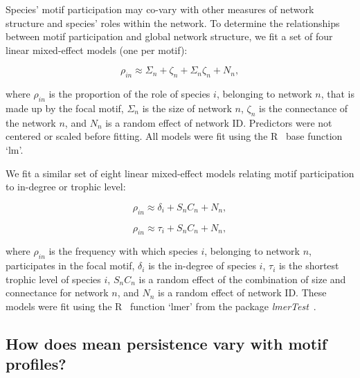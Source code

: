 \documentclass[12pt]{article}
\begin{document}
\begin{spacing}{2.0}
        Species' motif participation may co-vary with other measures of network structure and species' roles within the network.
        To determine the relationships between motif participation and global network structure, we fit a set of four linear mixed-effect models (one per motif):

        \begin{equation}
            \rho_{in} \approx \Sigma_{n} + \zeta_{n} + \Sigma_{n}\zeta_{n} + N_n ,
            \label{partic_SC}
        \end{equation}
        
        \noindent where $\rho_{in}$ is the proportion of the role of species $i$, belonging to network $n$, that is made up by the focal motif,
        $\Sigma_{n}$ is the size of network $n$, $\zeta_{n}$ is the connectance of the network $n$, and $N_n$ is a random effect of network ID.
        Predictors were not centered or scaled before fitting.
        All models were fit using the R~\citep{R} base function `lm'.

       
        We fit a similar set of eight linear mixed-effect models relating motif participation to in-degree or trophic level:
        
        \begin{equation}
            \rho_{in} \approx \delta_{i} + S_{n}C_{n} + N_n,
            \label{partic_deg}
        \end{equation}

        \begin{equation}
            \rho_{in} \approx \tau_{i} + S_{n}C_{n} + N_n,
            \label{partic_tl}
        \end{equation}
        
        \noindent where $\rho_{in}$ is the frequency with which species $i$, belonging to network $n$, participates in the focal motif, $\delta_{i}$ is the in-degree of species $i$, $\tau_{i}$ is the shortest trophic level of species $i$, $S_{n}C_{n}$ is a random effect of the combination of size and connectance for network $n$, and $N_n$ is a random effect of network ID.
        These models were fit using the R~\citep{R} function `lmer' from the package \emph{lmerTest}~\citep{lmerTest}.

    		
    \subsection{How does mean persistence vary with motif profiles?}


\end{spacing}
\end{document}
